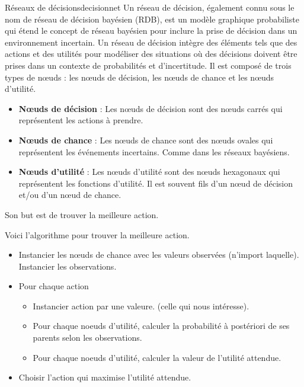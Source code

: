 \begin{definition}{Réseaux de décisions}{decisionnet}
    Un réseau de décision, également connu sous le nom de réseau de décision bayésien (RDB), 
    est un modèle graphique probabiliste qui étend le concept de réseau bayésien pour inclure la prise 
    de décision dans un environnement incertain. Un réseau de décision intègre des éléments tels que des 
    actions et des utilités pour modéliser des situations où des décisions doivent être prises dans un contexte de probabilités et d'incertitude.
    Il est composé de trois types de nœuds : les nœuds de décision, les nœuds de chance et les nœuds d'utilité. 
    \begin{itemize}
        \item \textbf{Nœuds de décision} : Les nœuds de décision sont des nœuds carrés qui représentent les actions à prendre. 
        \item \textbf{Nœuds de chance} : Les nœuds de chance sont des nœuds ovales qui représentent les événements incertains. Comme dans les réseaux bayésiens.
        \item \textbf{Nœuds d'utilité} : Les nœuds d'utilité sont des nœuds hexagonaux qui représentent les fonctions d'utilité. Il est souvent fils d'un nœud de décision et/ou d'un nœud de chance.
    \end{itemize}
    Son but est de trouver la meilleure action.
\end{definition}

Voici l'algorithme pour trouver la meilleure action.

\begin{itemize}[label=\textbullet]
    \item Instancier les nœuds de chance avec les valeurs observées (n'import laquelle). Instancier les observations.
    \item Pour chaque action
        \begin{itemize}[label=\textbullet]
            \item Instancier action par une valeure. (celle qui nous intéresse).
            \item Pour chaque noeuds d'utilité, calculer la probabilité à postériori de ses parents selon les observations.
            \item Pour chaque noeuds d'utilité, calculer la valeur de l'utilité attendue.
        \end{itemize}
    \item Choisir l'action qui maximise l'utilité attendue.
\end{itemize}

